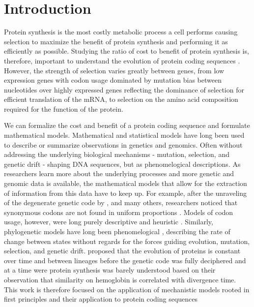\chapter{Introduction} 
\label{ch:introduction}

Protein synthesis is the most costly metabolic process a cell performs \citep{Reeds1985,WaterlowAndMillward1989,buttgereit1995,warner1999,AkashiAndGojobori2002,lindqvist2018} causing selection to maximize the benefit of protein synthesis and performing it as efficiently as possible.
Studying the ratio of cost to benefit of protein synthesis is, therefore, important to understand the evolution of protein coding sequences \citep{gilchrist2009,ShahAndGilchrist2011,gilchrist2015,beaulieu2018}.
However, the strength of selection varies greatly between genes, from low expression genes with codon usage dominated by mutation bias between nucleotides over highly expressed genes reflecting the dominance of selection for efficient translation of the mRNA, to selection on the amino acid composition required for the function of the protein.

We can formalize the cost and benefit of a protein coding sequence and formulate mathematical models.
Mathematical and statistical models have long been used to describe or summarize observations in genetics and genomics.
Often without addressing the underlying biological mechanisms - mutation, selection, and genetic drift - shaping DNA sequences, but as phenomelogical descriptions.
As researchers learn more about the underlying processes and more genetic and genomic data is available, the mathematical models that allow for the extraction of information from this data have to keep up.
For example, after the unraveling of the degenerate genetic code by \citet{MatthaeiAndNirenberg1961,NirenbergAndMatthaei1961,Maxwell1962,LederAndNirenberg1964}, and many others, researchers noticed that synonymous codons are not found in uniform proportions \citep{fitch1976,grantham1980,ikemura1981,grantham1981,sharp1988}.
Models of codon usage, however, were long purely descriptive and heuristic \citep{ikemura1981,BennetzenAndHall1982,sharp1987,Wright1990}.
Similarly, phylogenetic models have long been phenomelogical \citep{JukesAndCantor1969,Dayhoff1978,Kimura1980,felsenstein1981,Altschul1991}, describing the rate of change between states without regards for the forces guiding evolution, mutation, selection, and genetic drift.
\citet{ZuckerkandlAndPauling1962} proposed that the evolution of proteins is constant over time and between lineages before the genetic code was fully deciphered and at a time were protein synthesis was barely understood based on their observation that similarity on hemoglobin is correlated with divergence time.
This work is therefore focused on the application of mechanistic models rooted in first principles and their application to protein coding sequences

